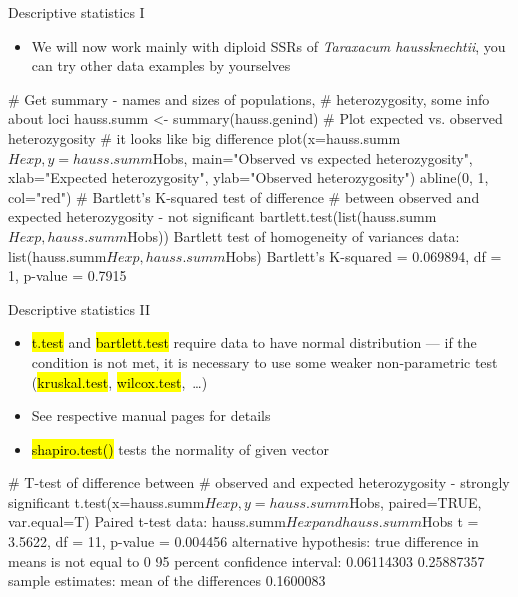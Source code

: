 \documentclass[compress, ucs, xelatex, 11pt, xcolor=svgnames,
  hyperref={
    bookmarks=true,
    unicode=true,
    colorlinks=true,
    pdftitle={Molecular data in R},
    plainpages=false,
    pdfauthor={Vojtech Zeisek},
    pdfsubject={Course about phylogeny and evolution in R},
    pdfcreator={XeLaTeX},
    pdfkeywords={R, evolution, phylogeny, molecular data},
    linkcolor=Tomato,
    anchorcolor=SaddleBrown,
    citecolor=Goldenrod,
    filecolor=DarkMagenta,
    menucolor=Sienna,
    urlcolor=DarkTurquoise,
    pdftex},
  url={hyphens, lowtilde} %
  ]{beamer}
\renewcommand{\texttt}[1]{\hl{\ttfamily #1}}
\begin{document}
\begin{frame}[fragile]{Descriptive statistics I}
  \label{popgenindx}
  \begin{itemize}
    \item We will now work mainly with diploid SSRs of \textit{Taraxacum haussknechtii}, you can try other data examples by yourselves
  \end{itemize}
  \begin{spluscode}
    # Get summary - names and sizes of populations,
    # heterozygosity, some info about loci
    hauss.summ <- summary(hauss.genind)
    # Plot expected vs. observed heterozygosity
    # it looks like big difference
    plot(x=hauss.summ$Hexp, y=hauss.summ$Hobs,
      main="Observed vs expected heterozygosity",
      xlab="Expected heterozygosity", ylab="Observed heterozygosity")
    abline(0, 1, col="red")
    # Bartlett's K-squared test of difference
    # between observed and expected heterozygosity - not significant
    bartlett.test(list(hauss.summ$Hexp, hauss.summ$Hobs))
                  Bartlett test of homogeneity of variances
    data:  list(hauss.summ$Hexp, hauss.summ$Hobs)
    Bartlett's K-squared = 0.069894, df = 1, p-value = 0.7915
  \end{spluscode}
\end{frame}

\begin{frame}[fragile]{Descriptive statistics II}
  \begin{itemize}
    \item \texttt{t.test} and \texttt{bartlett.test} require data to have normal distribution --- if the condition is not met, it is necessary to use some weaker non-parametric test (\texttt{kruskal.test}, \texttt{wilcox.test},~\ldots)
    \item See respective manual pages for details
    \item \texttt{shapiro.test()} tests the normality of given vector
  \end{itemize}
  \begin{spluscode}
    # T-test of difference between
    # observed and expected heterozygosity - strongly significant
    t.test(x=hauss.summ$Hexp, y=hauss.summ$Hobs, paired=TRUE, var.equal=T)
                 Paired t-test
    data:  hauss.summ$Hexp and hauss.summ$Hobs
    t = 3.5622, df = 11, p-value = 0.004456
    alternative hypothesis: true difference in means is not equal to 0
    95 percent confidence interval:
     0.06114303 0.25887357
    sample estimates:
    mean of the differences
                  0.1600083
  \end{spluscode}
\end{frame}
\end{document}
